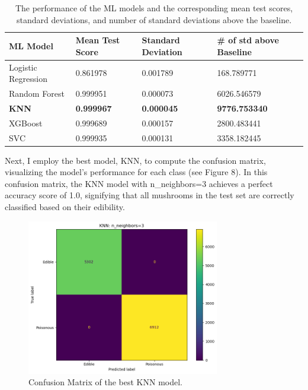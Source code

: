 \documentclass{article}
\begin{document}
\begin{table}[h]
\centering
\begin{tabular}{|l|l|l|l|} \hline
\textbf{ML Model} & \textbf{Mean Test Score} & \textbf{Standard Deviation} & \textbf{\# of std above Baseline}\\\hline
Logistic Regression & 0.861978 & 0.001789 & 168.789771\\ \hline
Random Forest & 0.999951 & 0.000073 & 6026.546579 \\ \hline
\textbf{KNN} & \textbf{0.999967} & \textbf{0.000045} & \textbf{9776.753340} \\ \hline
XGBoost & 0.999689 & 0.000157 & 2800.483441 \\ \hline
SVC & 0.999935 & 0.000131 & 3358.182445 \\ \hline
\end{tabular}
\caption{\label{tab:widgets} The performance of the ML models and the corresponding mean test scores, standard deviations, and number of standard deviations above the baseline.}
\end{table}

\newpage
Next, I employ the best model, KNN, to compute the confusion matrix, visualizing the model's performance for each class (see Figure 8). In this confusion matrix, the KNN model with n\_neighbors=3 achieves a perfect accuracy score of 1.0, signifying that all mushrooms in the test set are correctly classified based on their edibility.

\begin{figure}[h]
\centering
\includegraphics[width=0.75\textwidth]{confusion_matrix_knn_rs=0.png}
\caption{\label{fig:confusion matrix} Confusion Matrix of the best KNN model.}
\end{figure}
\end{document}
